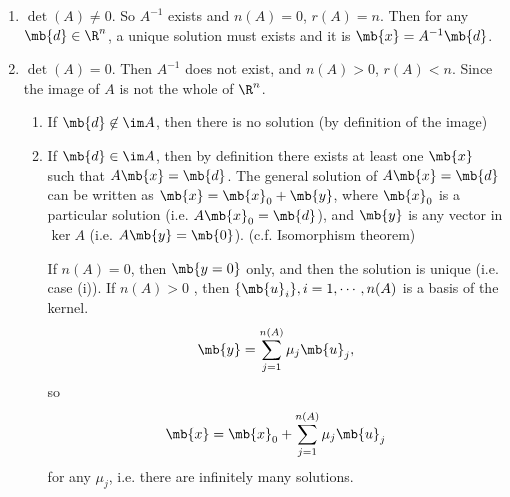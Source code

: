 \documentclass[a4paper]{article}
\begin{document}
\begin{enumerate}
\item $\det(A) \not= 0$. So $A^{-1}$ exists and $n(A) = 0$, $r(A) = n$. Then for any $\mb{d}\in \R^n$, a unique solution must exists and it is $\mb{x} = A^{-1}\mb{d}$.
\item $\det(A) = 0$. Then $A^{-1}$ does not exist, and $n(A) > 0$, $r(A) < n$. Since the image of $A$ is not the whole of $\R^n$.
  \begin{enumerate}
  \item If $\mb{d}\not\in \im A$, then there is no solution (by definition of the image)
  \item If $\mb{d}\in \im A$, then by definition there exists at least one $\mb{x}$ such that $A\mb{x} = \mb{d}$. The general solution of $A\mb{x} = \mb{d}$  can be written as $\mb{x} = \mb{x}_0 + \mb{y}$, where $\mb{x}_0$ is a particular solution (i.e. $A\mb{x}_0 = \mb{d}$), and $\mb{y}$ is any vector in $\ker A$ (i.e. $A\mb{y} = \mb{0}$). (c.f. Isomorphism theorem)

    If $n(A) = 0$, then $\mb{y = 0}$ only, and then the solution is unique (i.e. case (i)). If $n(A) > 0$ , then $\{\mb{u}_i\}, i = 1, \cdots, n(A)$ is a basis of the kernel.
\[
\mb{y} = \sum_{j = 1}^{n(A)} \mu_j \mb{u}_j,
\]
so
\[
\mb{x} = \mb{x}_0 + \sum_{j = 1}^{n(A)} \mu_j \mb{u}_j
\]
for any $\mu_j$, i.e. there are infinitely many solutions.
  \end{enumerate}
\end{enumerate}
\end{document}
